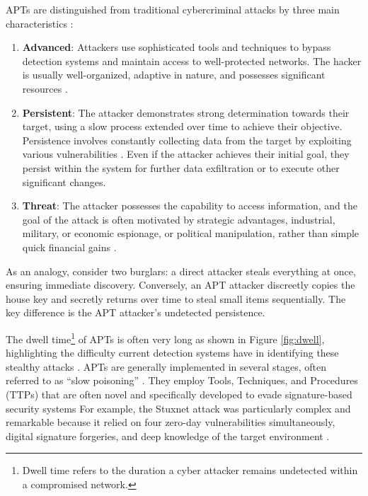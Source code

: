 APTs are distinguished from traditional cybercriminal attacks by three main characteristics \cite{krishnapriya2024comprehensive,singh2016comprehensive}:
\begin{enumerate}
    \item \textbf{Advanced}: Attackers use sophisticated tools and techniques to bypass detection systems and maintain access to well-protected networks. The hacker is usually well-organized, adaptive in nature, and possesses significant resources \cite{singh2016comprehensive}.
    \item \textbf{Persistent}: The attacker demonstrates strong determination towards their target, using a slow process extended over time to achieve their objective. Persistence involves constantly collecting data from the target by exploiting various vulnerabilities \cite{krishnapriya2024comprehensive}. Even if the attacker achieves their initial goal, they persist within the system for further data exfiltration or to execute other significant changes.
    \item \textbf{Threat}: The attacker possesses the capability to access information, and the goal of the attack is often motivated by strategic advantages, industrial, military, or economic espionage, or political manipulation, rather than simple quick financial gains \cite{singh2016comprehensive}.
\end{enumerate}

As an analogy, consider two burglars: a direct attacker steals everything at once, ensuring immediate discovery. Conversely, an APT attacker discreetly copies the house key and secretly returns over time to steal small items sequentially. The key difference is the APT attacker's undetected persistence.

The dwell time\footnote{Dwell time refers to the duration a cyber attacker remains undetected within a compromised network.} of APTs is often very long as shown in Figure \ref{fig:dwell}, highlighting the difficulty current detection systems have in identifying these stealthy attacks \cite{krishnapriya2024comprehensive}. APTs are generally implemented in several stages, often referred to as ``slow poisoning'' \cite{krishnapriya2024comprehensive}. They employ Tools, Techniques, and Procedures (TTPs) that are often novel and specifically developed to evade signature-based security systems For example, the Stuxnet attack was particularly complex and remarkable because it relied on four zero-day vulnerabilities simultaneously, digital signature forgeries, and deep knowledge of the target environment \cite{singh2016comprehensive}.


